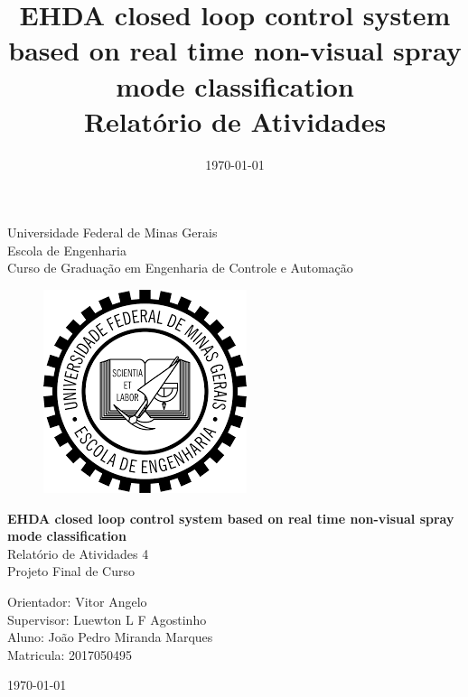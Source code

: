 \begin{titlepage}
    \begin{center}
           
    {\large Universidade Federal de Minas Gerais\\
    Escola de Engenharia \\
    Curso de Graduação em Engenharia de Controle e Automação\\}
    \vfill

    \begin{figure}[h]
        \centering
        \includegraphics[scale=0.5]{images/brasao_ufmg.png}
    \end{figure}
    \vspace{2cm}


    {\bf\Large EHDA closed loop control system based on real time non-visual spray mode classification\\}
    \vspace{1cm} 
    {\Large Relatório de Atividades 4   \\  Projeto Final de Curso}
    \vspace{2cm}  
    
    {\large Orientador: Vitor Angelo\\
            Supervisor: Luewton L F Agostinho}\\

    
    {\large Aluno: João Pedro Miranda Marques \\
    Matricula: 2017050495}
    \vspace{2cm}  

    \today
    \vspace{2cm}  
       

    \large \date{\today}
    \end{center}
    
    \end{titlepage}
    
    \newpage
    \clearpage
    \thispagestyle{empty}
    
    \cleardoublepage


\title{
    EHDA closed loop control system based on real time non-visual spray mode classification \\
    \large Relatório de Atividades}

